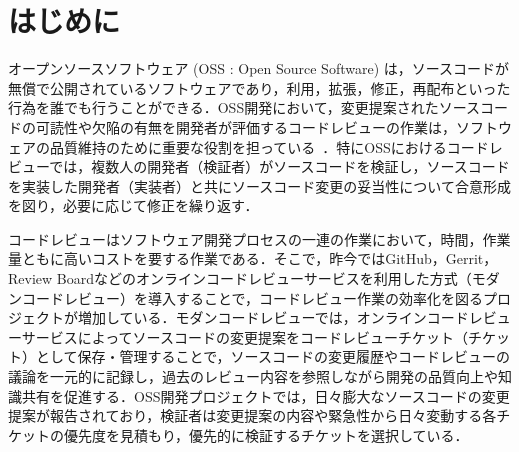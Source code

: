 \documentclass[11pt]{jreport}
\begin{document}
\tableofcontents



\newpage
{}	%



\chapter{はじめに}

オープンソースソフトウェア (OSS : Open Source Software) は，ソースコードが無償で公開されているソフトウェアであり，利用，拡張，修正，再配布といった行為を誰でも行うことができる．OSS開発において，変更提案されたソースコードの可読性や欠陥の有無を開発者が評価するコードレビューの作業は，ソフトウェアの品質維持のために重要な役割を担っている~\cite{quality1}\cite{quality2}．特にOSSにおけるコードレビューでは，複数人の開発者（検証者）がソースコードを検証し，ソースコードを実装した開発者（実装者）と共にソースコード変更の妥当性について合意形成を図り，必要に応じて修正を繰り返す．

コードレビューはソフトウェア開発プロセスの一連の作業において，時間，作業量ともに高いコストを要する作業である\cite{cost}．そこで，昨今ではGitHub，Gerrit，Review Boardなどのオンラインコードレビューサービスを利用した方式（モダンコードレビュー\cite{quality1}）を導入することで，コードレビュー作業の効率化を図るプロジェクトが増加している．モダンコードレビューでは，オンラインコードレビューサービスによってソースコードの変更提案をコードレビューチケット（チケット）として保存・管理することで，ソースコードの変更履歴やコードレビューの議論を一元的に記録し，過去のレビュー内容を参照しながら開発の品質向上や知識共有を促進する．OSS開発プロジェクトでは，日々膨大なソースコードの変更提案が報告されており，検証者は変更提案の内容や緊急性から日々変動する各チケットの優先度を見積もり，優先的に検証するチケットを選択している\cite{integrator}．
\end{document}
